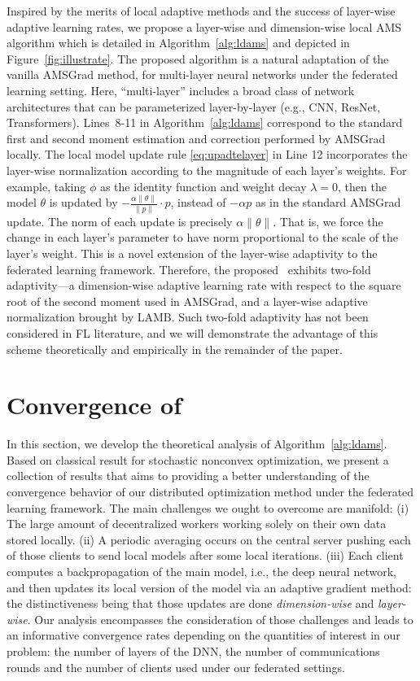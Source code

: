 \documentclass[manuscript,screen,review]{acmart}
\begin{document}
Inspired by the merits of local adaptive methods and the success of layer-wise adaptive learning rates, we propose a layer-wise and dimension-wise local AMS algorithm which is detailed in Algorithm~\ref{alg:ldams} and  depicted in Figure~\ref{fig:illustrate}. The proposed algorithm is a natural adaptation of the vanilla AMSGrad method, for multi-layer neural networks under the federated learning setting. Here, ``multi-layer'' includes a broad class of network architectures that can be parameterized layer-by-layer (e.g., CNN, ResNet, Transformers). Lines~8-11 in Algorithm~\ref{alg:ldams} correspond to the standard first and second moment estimation and correction performed by AMSGrad locally. The local model update rule \eqref{eq:upadtelayer} in Line 12 incorporates the layer-wise normalization according to the magnitude of each layer's weights. For example, taking $\phi$ as the identity function and weight decay $\lambda=0$, then the model $\theta$ is updated by $-\frac{\alpha \| \theta\|}{\|p\|}\cdot p$, instead of $-\alpha p$ as in the standard AMSGrad update. The norm of each update is precisely $\alpha \|\theta\|$. That is, we force the change in each layer's parameter to have norm proportional to the scale of the layer's weight. This is a novel extension of the layer-wise adaptivity to the federated learning framework. Therefore, the proposed \algo\ exhibits two-fold adaptivity---a dimension-wise adaptive learning rate with respect to the square root of the second moment used in AMSGrad, and a layer-wise adaptive normalization brought by LAMB. Such two-fold adaptivity has not been considered in FL literature, and we will demonstrate the advantage of this scheme theoretically and empirically in the remainder of the paper.




\section{Convergence of \algo}\label{sec:theory}
In this section, we develop the theoretical analysis of Algorithm~\ref{alg:ldams}.  Based on classical result for stochastic nonconvex optimization, we present a collection of results that aims to providing a better understanding of the convergence behavior of our distributed optimization method under the federated learning framework.
The main challenges we ought to overcome are manifold:
(i) The large amount of decentralized workers working solely on their own data stored locally. 
(ii) A periodic averaging occurs on the central server pushing each of those clients to send local models after some local iterations. 
(iii) Each client computes a backpropagation of the main model, i.e., the deep neural network, and then updates its local version of the model via an adaptive gradient method: the distinctiveness being that those updates are done \emph{dimension-wise} and \emph{layer-wise}.
Our analysis encompasses the consideration of those challenges and leads to an informative convergence rates depending on the quantities of interest in our problem: the number of layers of the DNN, the number of communications rounds and the number of clients used under our federated settings.
\end{document}
